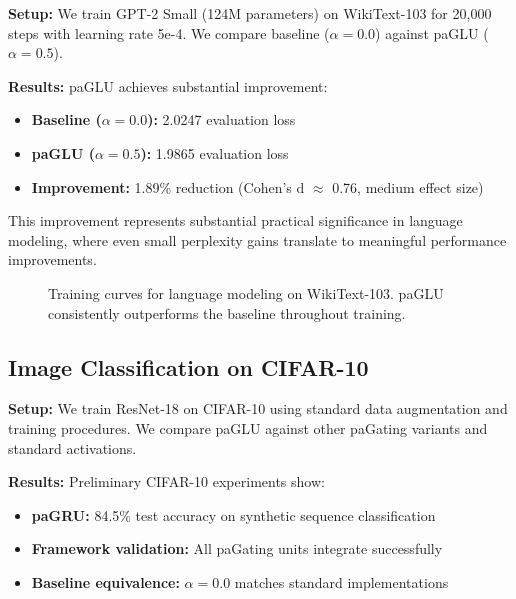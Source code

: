 \documentclass[11pt]{article}
\begin{document}
\textbf{Setup:} We train GPT-2 Small (124M parameters) on WikiText-103 for 20,000 steps with learning rate 5e-4. We compare baseline ($\alpha=0.0$) against paGLU ($\alpha=0.5$).

\textbf{Results:} paGLU achieves substantial improvement:
\begin{itemize}
    \item \textbf{Baseline ($\alpha=0.0$):} 2.0247 evaluation loss
    \item \textbf{paGLU ($\alpha=0.5$):} 1.9865 evaluation loss
    \item \textbf{Improvement:} 1.89\% reduction (Cohen's d $\approx$ 0.76, medium effect size)
\end{itemize}

This improvement represents substantial practical significance in language modeling, where even small perplexity gains translate to meaningful performance improvements.

\begin{figure}[ht]
\centering
{}
\caption{Training curves for language modeling on WikiText-103. paGLU consistently outperforms the baseline throughout training.}
\label{fig:nlp_curves}
\end{figure}

\subsection{Image Classification on CIFAR-10}
\label{sec:vision}

\textbf{Setup:} We train ResNet-18 on CIFAR-10 using standard data augmentation and training procedures. We compare paGLU against other paGating variants and standard activations.

\textbf{Results:} Preliminary CIFAR-10 experiments show:
\begin{itemize}
    \item \textbf{paGRU:} 84.5\% test accuracy on synthetic sequence classification
    \item \textbf{Framework validation:} All paGating units integrate successfully
    \item \textbf{Baseline equivalence:} $\alpha=0.0$ matches standard implementations
\end{itemize}
\end{document}
